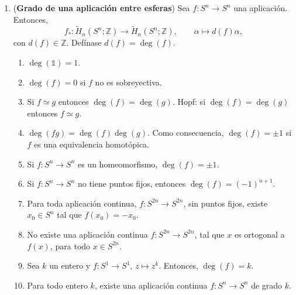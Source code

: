 \documentclass[11pt,a4paper]{article}
\theoremstyle{plain}
\theoremstyle{definition}
\theoremstyle{remark}
\newcommand{\ZZ}{\mathbb Z}
\begin{document}
\begin{enumerate}[label=\arabic*.,leftmargin=*]
\item (\textbf{Grado de una aplicación entre esferas}) Sea $f:S^n\to S^n$
una aplicación. Entonces,
\[
f_*:\tilde H_n(S^n;\ZZ)\to\tilde H_n(S^n;\ZZ), \qquad \alpha\mapsto d(f)\alpha,
\]
con $d(f)\in\ZZ$. Defínase $d(f)=\deg(f)$.
\begin{enumerate}[label=\alph*)]
\item $\deg(\mathbb 1)=1$.
\item $\deg(f)=0$ si $f$ no es sobreyectiva.
\item Si $f\simeq g$ entonces $\deg(f)=\deg(g)$. Hopf: si $\deg(f)=\deg(g)$
entonces $f\simeq g$.
\item $\deg(fg)=\deg(f)\deg(g)$. Como consecuencia, $\deg(f)=\pm1$ si $f$
es una equivalencia homotópica.
\item Si $f:S^n\to S^n$ es un homeomorfismo, $\deg(f)=\pm1$.
\item Si $f:S^n\to S^n$ no tiene puntos fijos, entonces
$\deg(f)=(-1)^{n+1}$.
\item Para toda aplicación continua, $f:S^{2n}\to S^{2n}$, sin puntos fijos,
existe $x_0\in S^n$ tal que $f(x_0)=-x_0$.
\item No existe una aplicación continua $f:S^{2n}\to S^{2n}$, tal que $x$
es ortogonal a $f(x)$, para todo $x\in S^{2n}$.
\item Sea $k$ un entero y $f:S^1\to S^1$, $z\mapsto z^k$. Entonces,
$\deg(f)=k$.
\item Para todo entero $k$, existe una aplicación continua $f:S^n\to S^n$
de grado $k$.
\end{enumerate}


\end{enumerate}
\end{document}
